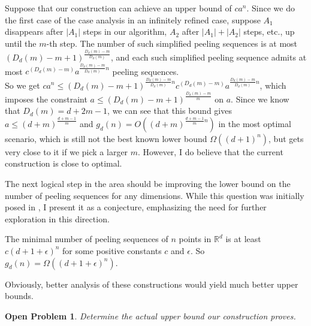\documentclass[a4paper,UKenglish,cleveref, autoref, thm-restate]{lipics-v2021}
\newtheorem{problem}[theorem]{Open Problem}
\def\R{\mathbb{R}}
\begin{document}
   Suppose that our construction can achieve an upper bound of $ca^n$. Since we do the first case of the case analysis in an infinitely refined case, suppose $A_1$ disappears after $|A_1|$ steps in our algorithm, $A_2$ after $|A_1|+|A_2|$ steps, etc., up until the $m$-th step. The number of such simplified peeling sequences is at most $(D_d(m)-m+1)^{\frac{D_d(m)-m}{D_d(m)}}$, and each such simplified peeling sequence admits at most $c^{(D_d(m)-m)}a^{\frac{D_d(m)-m}{D_d(m)}n}$ peeling sequences. \\ So we get $ca^n\leq (D_d(m)-m+1)^{\frac{D_d(m)-m}{D_d(m)}n}c^{(D_d(m)-m)}a^{\frac{D_d(m)-m}{D_d(m)}n}$, which imposes the constraint $a\leq(D_d(m)-m+1)^{\frac{D_d(m)-m}{m}}$ on $a$. Since we know that $D_d(m)=d+2m-1$, we can see that this bound gives $a\leq(d+m)^{\frac{d+m-1}{m}}$ and $g_d(n)=O((d+m)^{\frac{d+m-1}{m}n})$ in the most optimal scenario, which is still not the best known lower bound $\Omega((d+1)^n)$, but gets very close to it if we pick a larger $m$. However, I do believe that the current construction is close to optimal.
    
   The next logical step in the area should be improving the lower bound on the number of peeling sequences for any dimensions. While this question was initially posed in \cite{Dumitrescu}, I present it as a conjecture, emphasizing the need for further exploration in this direction.

    \begin{conjecture}
        The minimal number of peeling sequences of $n$ points in $\R^d$ is at least $c(d+1+\epsilon)^n$ for some positive constants $c$ and $\epsilon$. So $g_d(n)=\Omega((d+1+\epsilon)^n)$.
    \end{conjecture}

    Obviously, better analysis of these constructions would yield much better upper bounds.

    \begin{problem}
        Determine the actual upper bound our construction proves.
    \end{problem}
\end{document}
